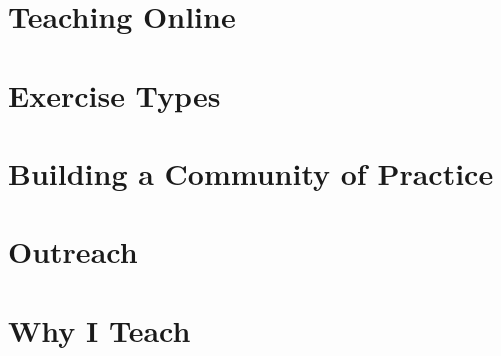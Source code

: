 \documentclass[nemilov1]{Nemilov}
\begin{document}
\section{Teaching Online}

\section{Exercise Types}

\section{Building a Community of Practice}

\section{Outreach}

\section{Why I Teach}
\end{document}
